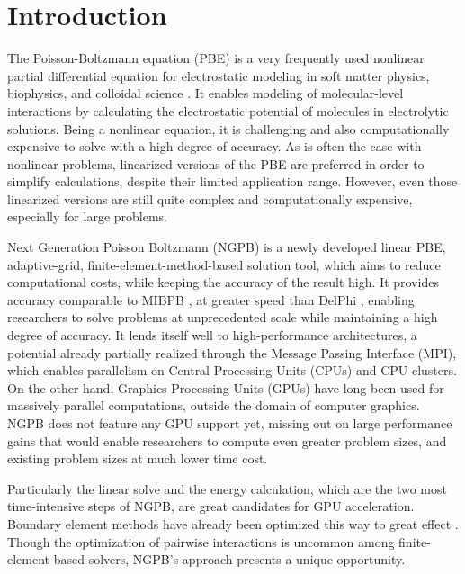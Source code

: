 \chapter{Introduction}
\label{sec:introduction}

The Poisson-Boltzmann equation (PBE) is a very frequently used nonlinear partial differential equation for electrostatic modeling in soft matter physics, biophysics, and colloidal science \cite{besley2023electrostatictheory, yang2023evergreen}. 
It enables modeling of molecular-level interactions by calculating the electrostatic potential of molecules in electrolytic solutions. 
Being a nonlinear equation, it is challenging and also computationally expensive to solve with a high degree of accuracy. 
As is often the case with nonlinear problems, linearized versions of the PBE are preferred in order to simplify calculations, despite their limited application range. 
However, even those linearized versions are still quite complex and computationally expensive, especially for large problems. 

Next Generation Poisson Boltzmann (NGPB) \cite{diflorio2025nextgenpb} is a newly developed linear PBE, adaptive-grid, finite-element-method-based solution tool, which aims to reduce computational costs, while keeping the accuracy of the result high. 
It provides accuracy comparable to MIBPB \cite{chen2011mibpb}, at greater speed than DelPhi \cite{li2012delphi}, enabling researchers to solve problems at unprecedented scale while maintaining a high degree of accuracy. 
It lends itself well to high-performance architectures, a potential already partially realized through the Message Passing Interface (MPI), which enables parallelism on Central Processing Units (CPUs) and CPU clusters. 
On the other hand, Graphics Processing Units (GPUs) have long been used for massively parallel computations, outside the domain of computer graphics. 
NGPB does not feature any GPU support yet, missing out on large performance gains that would enable researchers to compute even greater problem sizes, and existing problem sizes at much lower time cost.

Particularly the linear solve and the energy calculation, which are the two most time-intensive steps of NGPB, are great candidates for GPU acceleration.
Boundary element methods have already been optimized this way to great effect \cite{wilson2022tabipb2,yokota2011fmbem}.
Though the optimization of pairwise interactions is uncommon among finite-element-based solvers, NGPB's approach presents a unique opportunity.

